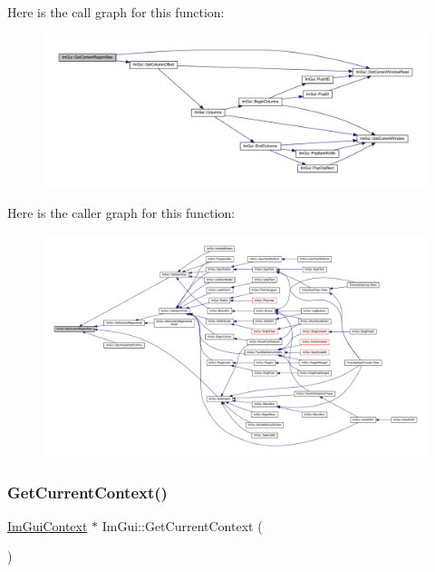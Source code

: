 Here is the call graph for this function\+:
\nopagebreak
\begin{figure}[H]
\begin{center}
\leavevmode
\includegraphics[width=350pt]{namespace_im_gui_a0a4dbfabbfa45d74319ef541962ce2eb_cgraph}
\end{center}
\end{figure}
Here is the caller graph for this function\+:
\nopagebreak
\begin{figure}[H]
\begin{center}
\leavevmode
\includegraphics[width=350pt]{namespace_im_gui_a0a4dbfabbfa45d74319ef541962ce2eb_icgraph}
\end{center}
\end{figure}
\mbox{\label{namespace_im_gui_af557a6de5538099a0f6047eb994bbf42}} 
\subsubsection{\texorpdfstring{Get\+Current\+Context()}{GetCurrentContext()}}
{\footnotesize\ttfamily \mbox{\hyperlink{struct_im_gui_context}{Im\+Gui\+Context}} $\ast$ Im\+Gui\+::\+Get\+Current\+Context (\begin{DoxyParamCaption}{ }\end{DoxyParamCaption})}

